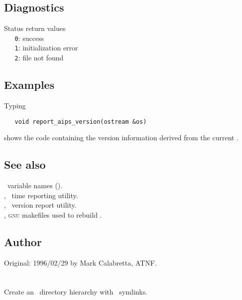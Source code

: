 \subsection*{Diagnostics}
 
Status return values
\\ \verb+   0+: success
\\ \verb+   1+: initialization error
\\ \verb+   2+:  file not found
 
\subsection*{Examples}
 
Typing

\begin{verbatim}
   void report_aips_version(ostream &os)
\end{verbatim}

\noindent
shows the code containing the version information derived from the current
.
 
\subsection*{See also}
 
\aipspp\ variable names ().\\
, \aipspp\ time reporting utility.\\
, \aipspp\ version report utility.\\
, \textsc{gnu} makefiles used to rebuild \aipspp.
 
\subsection*{Author}
 
Original: 1996/02/29 by Mark Calabretta, ATNF.


\newpage
\section{}
\label{mktree.svn}

Create an \aipspp\ directory hierarchy with \rcs\ symlinks.

